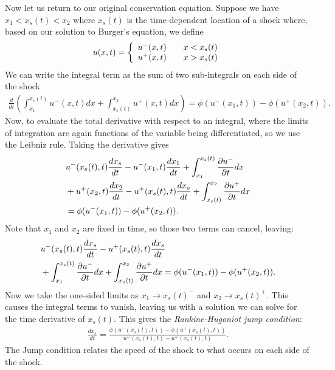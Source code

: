 Now let us return to our original conservation equation. Suppose we have $x_1 < x_s(t) < x_2$ where $x_s(t)$ is the time-dependent location of a shock where, based on our solution to Burger's equation, we define
\begin{align}
  u(x,t) = \left\{ \begin{array}{r l}
  u^-(x,t) & \quad x < x_s(t) \\
  u^+(x,t) & \quad x > x_s(t) \\ \end{array} \right.
\end{align}
We can write the integral term as the sum of two sub-integrals on each side of the shock
\begin{align}
  \frac{d}{dt} \left(  \int_{x_1}^{x_s(t)} u^-(x,t) dx + \int_{x_s(t)}^{x_2} u^+(x,t) dx   \right) = \phi(u^-(x_1,t)) - \phi(u^+(x_2,t)).
\end{align}
Now, to evaluate the total derivative with respect to an integral, where the limits of integration are again functions of the variable being differentiated, so we use the Leibniz rule. Taking the derivative gives
\begin{align}
  &u^-(x_s(t),t) \frac{dx_s}{dt} - u^-(x_1,t) \frac{dx_1}{dt} + \int_{x_1}^{x_s(t)} \frac{ \partial {u^-} }{ \partial {t} } dx  \nonumber \\
  &+ u^+(x_2,t) \frac{dx_2}{dt} - u^+(x_s(t),t) \frac{dx_s}{dt} + \int_{x_s(t)}^{x_2} \frac{ \partial {u^+} }{ \partial {t} } dx   \nonumber \\
  &= \phi(u^-(x_1,t)) - \phi(u^+(x_2,t)).
\end{align}
Note that $x_1$ and $x_2$ are fixed in time, so those two terms can cancel, leaving:
\begin{align}
  &u^-(x_s(t),t) \frac{dx_s}{dt} - u^+(x_s(t),t) \frac{dx_s}{dt}   \nonumber \\
  &+ \int_{x_1}^{x_s(t)} \frac{ \partial {u^-} }{ \partial {t} } dx + \int_{x_s(t)}^{x_2} \frac{ \partial {u^+} }{ \partial {t} } dx = \phi(u^-(x_1,t)) - \phi(u^+(x_2,t)).
\end{align}
Now we take the one-sided limits as $x_1 \rightarrow x_s(t)^-$ and $x_2 \rightarrow x_s(t)^+$. This causes the integral terms to vanish, leaving us with a solution we can solve for the time derivative of $x_s(t)$. This gives the \emph{Rankine-Hugoniot jump condition}:
\begin{align}
  \frac{dx_s}{dt} = \frac{ \phi(u^-(x_s(t),t)) - \phi(u^+(x_s(t),t)) }{ u^-(x_s(t),t) - u^+(x_s(t),t) } .
\end{align}
The Jump condition relates the speed of the shock to what occurs on each side of the shock.

